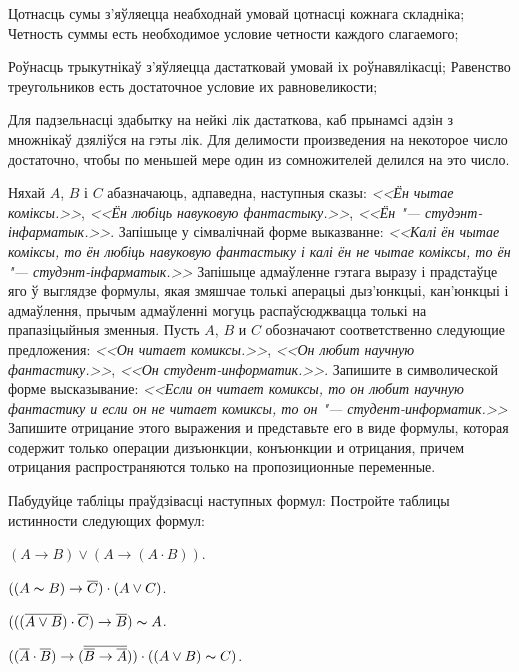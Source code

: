 \begin{problemList}
\begin{belarusianEnumerate}
\problemItemSimple
{Цотнасць сумы з'яўляецца неабходнай умовай цотнасці кожнага складніка;}
{Четность суммы есть необходимое условие четности каждого слагаемого;}

\problemItemSimple
{Роўнасць трыкутнікаў з'яўляецца дастатковай умовай іх роўнавялікасці;}
{Равенство треугольников есть достаточное условие их равновеликости;}

\problemItemSimple
{Для падзельнасці здабытку на нейкі лік дастаткова, каб прынамсі адзін з множнікаў дзяліўся на гэты лік.}
{Для делимости произведения на некоторое число достаточно, чтобы по меньшей мере один из сомножителей делился на это число.}

\end{belarusianEnumerate}

\bigskip

\problemItemSimple
{Няхай $A$, $B$ і $C$ абазначаюць, адпаведна, наступныя сказы:
\textit{<<Ён чытае коміксы.>>},
\textit{<<Ён любіць навуковую фантастыку.>>},
\textit{<<Ён "--- студэнт-інфарматык.>>}.
Запішыце у сімвалічнай форме выказванне: \textit{<<Калі ён чытае коміксы,
то ён любіць навуковую фантастыку і калі ён не чытае коміксы, то ён "---
студэнт-інфарматык.>>} Запішыце адмаўленне гэтага выразу і прадстаўце яго ў выглядзе формулы,
якая змяшчае толькі аперацыі дыз'юнкцыі, кан'юнкцыі і адмаўлення, прычым адмаўленні могуць распаўсюджвацца
толькі на прапазіцыйныя зменныя.}
{Пусть $A$, $B$ и $C$ обозначают соответственно следующие предложения:
\textit{<<Он читает комиксы.>>},
\textit{<<Он любит научную фантастику.>>},
\textit{<<Он студент-информатик.>>}.
Запишите в символической форме высказывание: \textit{<<Если он читает
комиксы, то он любит научную фантастику и если он не читает комиксы, то он "---
студент-информатик.>>} Запишите отрицание этого выражения и представьте
его в виде формулы, которая содержит только операции дизъюнкции, конъюнкции и
отрицания, причем отрицания распространяются только на пропозиционные переменные.}

\bigskip

\problemItemWithCommonPart
{Пабудуйце табліцы праўдзівасці наступных формул:}
{Постройте таблицы истинности следующих формул:}
{%
\begin{belarusianEnumerate}

\item $(A \to B) \vee (A \to (A \cdot B))$.
\item $((A \thicksim B) \to \overline{C}) \cdot (A \vee C)$.
\item $(((\overline{A \vee B}) \cdot \overline{C}) \to \overline{B}) \thicksim A$.
\item $((\overline{A} \cdot \overline{B}) \to (\overline{\overline{B} \to \overline{A}}))
\cdot ((A \vee B) \thicksim C)$.


\end{belarusianEnumerate}}
\end{problemList}
